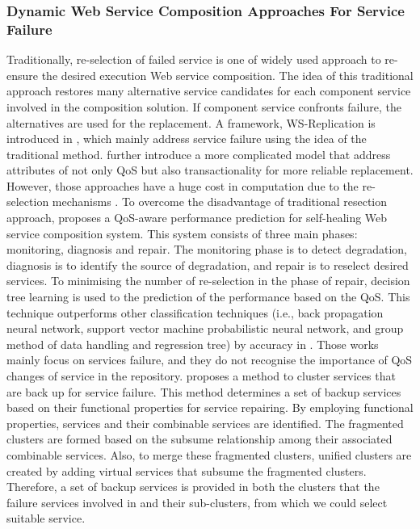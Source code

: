 \subsubsection{Dynamic Web Service Composition Approaches For Service Failure}\label{dynamicService}
Traditionally, re-selection of failed service is one of widely used approach to re-ensure the desired execution Web service composition. The idea of this traditional approach restores many alternative service candidates for each component service involved in the composition solution. If component service confronts failure, the alternatives are used for the replacement.  A framework, WS-Replication is introduced in \cite{salas2006ws}, which mainly address service failure using the idea of the traditional method. \cite{yin2010qos} further introduce a more complicated model that address attributes of not only QoS but also transactionality for more reliable replacement. However, those approaches \cite{salas2006ws,yin2010qos} have a huge cost in computation due to the re-selection mechanisms \cite{nasridinov2012qos}. To overcome the disadvantage of traditional resection approach, \cite{nasridinov2012qos} proposes a QoS-aware performance prediction for self-healing Web service composition system. This system consists of three main phases: monitoring, diagnosis and repair. The monitoring phase is to detect degradation, diagnosis is to identify the source of degradation, and repair is to reselect desired services. To minimising the number of re-selection in the phase of repair, decision tree learning is used to the prediction of the performance based on the QoS. This technique outperforms other classification techniques (i.e., back propagation neural network, support vector machine probabilistic neural network, and group method of data handling and regression tree) by accuracy in \cite{mohanty2010Web}.  Those works mainly focus on services failure, and they do not recognise the importance of  QoS changes of service in the repository. \cite{wagner2016robust} proposes a method to cluster services that are back up for service failure. This method determines a set of backup services based on their functional properties for service repairing. By employing functional properties, services and their combinable services are identified. The fragmented clusters are formed based on the subsume relationship among their associated combinable services. Also, to merge these fragmented clusters, unified clusters are created by adding virtual services that subsume the fragmented clusters. Therefore, a set of backup services is provided in both the clusters that the failure services involved in and their sub-clusters, from which we could select suitable service.


